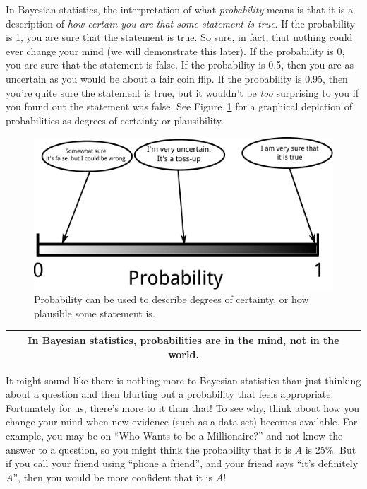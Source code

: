 In Bayesian statistics, the interpretation of what {\it probability} means is
that it is a description of {\it how certain you are that some statement is
true}.
If the probability is 1, you are sure that the statement is true. So sure, in
fact, that nothing could ever change your mind (we will demonstrate this later).
If the probability is 0, you
are sure that the statement is false. If the probability is 0.5, then you
are as uncertain as you would be about a fair coin flip. If the probability is
0.95, then you're quite sure the statement is true, but it wouldn't be {\it too}
surprising to you if you found out the statement was false. See
Figure~\ref{fig:probability_scale} for a graphical depiction of probabilities
as degrees of certainty or plausibility.

\begin{figure}
\begin{center}
\includegraphics[scale=0.6]{Figures/probability_scale.pdf}
\caption{Probability can be used to describe degrees of certainty, or
how plausible some statement is.\label{fig:probability_scale}}
\end{center}
\end{figure}

\begin{center}
\begin{tabular}{|c|}
\hline
{\bf In Bayesian statistics, probabilities are in the mind, not in the world.}\\
\hline
\end{tabular}
\end{center}

It might sound like there is nothing more to Bayesian statistics than just
thinking about a question and then blurting out a probability that feels
appropriate. Fortunately for us, there's more to it than that! To see why, think
about how you change your mind when new evidence (such as a data set) becomes
available. For example, you may be on ``Who Wants to be a Millionaire?'' and
not know the answer to a question, so you might think the probability that it is
$A$ is 25\%. But if you call your friend using ``phone a friend'', and
your friend says
``it's definitely $A$'', then you would be more confident that it is $A$!

